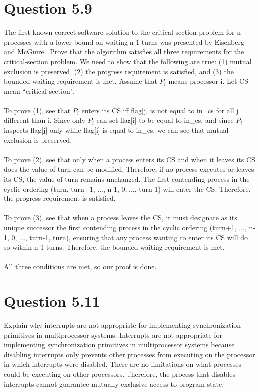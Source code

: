 \documentclass[12pt]{article}
\begin{document}
\section*{Question 5.9} {\color{blue}The first known correct software solution to the critical-section problem for n processes with a lower bound on waiting n-1 turns was presented by Eisenberg and McGuire...Prove that the algorithm satisfies all three requirements for the critical-section problem.} We need to show that the following are true: (1) mutual exclusion is preserved, (2) the progress requirement is satisfied, and (3) the bounded-waiting requirement is met. Assume that $P_{i}$ means processor i. Let CS mean ``critical section".
\\ \\
To prove (1), see that $P_{i}$ enters its CS iff flag[j] is not equal to in\_cs for all j different than i. Since only $P_{i}$ can set flag[i] to be equal to in\_cs, and since $P_{i}$ inspects flag[j] only while flag[i] is equal to in\_cs, we can see that mutual exclusion is preserved.
\\ \\
To prove (2), see that only when a process enters its CS and when it leaves its CS does the value of turn can be modified. Therefore, if no process executes or leaves its CS, the value of turn remains unchanged. The first contending process in the cyclic ordering (turn, turn+1, ..., n-1, 0, ..., turn-1) will enter the CS. Therefore, the progress requirement is satisfied.
\\ \\
To prove (3), see that when a process leaves the CS, it must designate as its unique successor the first contending process in the cyclic ordering (turn+1, ..., n-1, 0, ..., turn-1, turn), ensuring that any process wanting to enter its CS will do so within n-1 turns. Therefore, the bounded-waiting requirement is met.
\\ \\
All three conditions are met, so our proof is done.

\section*{Question 5.11} {\color{blue}Explain why interrupts are not appropriate for implementing synchronization primitives in multiprocessor systems.} 
Interrupts are not appropriate for implementing synchronization primitives in multiprocessor systems because disabling interrupts only prevents other processes from executing on the processor in which interrupts were disabled. There are no limitations on what processes could be executing on other processors. Therefore, the process that disables interrupts cannot guarantee mutually exclusive access to program state.
\end{document}
